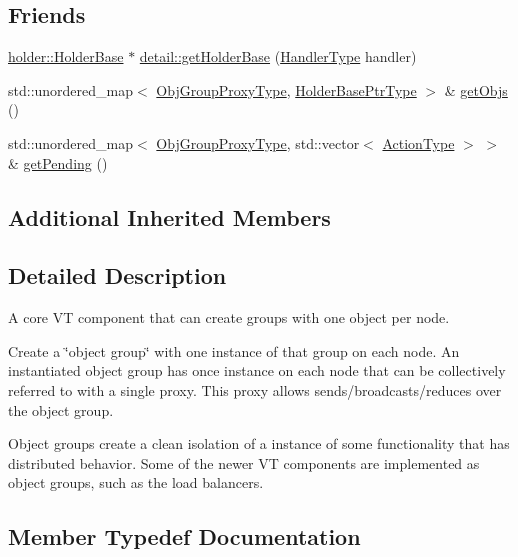 \subsection*{Friends}
\begin{DoxyCompactItemize}
\item 
\hyperlink{structvt_1_1objgroup_1_1holder_1_1_holder_base}{holder\+::\+Holder\+Base} $\ast$ \hyperlink{structvt_1_1objgroup_1_1_obj_group_manager_a82fbcce71412249dde967ed026e172fe}{detail\+::get\+Holder\+Base} (\hyperlink{namespacevt_af64846b57dfcaf104da3ef6967917573}{Handler\+Type} handler)
\item 
std\+::unordered\+\_\+map$<$ \hyperlink{namespacevt_ad7cae989df485fccca57f0792a880a8e}{Obj\+Group\+Proxy\+Type}, \hyperlink{structvt_1_1objgroup_1_1_obj_group_manager_ac1e9bb19d4a5923dd6d595bad28f04c9}{Holder\+Base\+Ptr\+Type} $>$ \& \hyperlink{structvt_1_1objgroup_1_1_obj_group_manager_a7ed69e806c1bc835de7080288a9803d9}{get\+Objs} ()
\item 
std\+::unordered\+\_\+map$<$ \hyperlink{namespacevt_ad7cae989df485fccca57f0792a880a8e}{Obj\+Group\+Proxy\+Type}, std\+::vector$<$ \hyperlink{namespacevt_ae0a5a7b18cc99d7b732cb4d44f46b0f3}{Action\+Type} $>$ $>$ \& \hyperlink{structvt_1_1objgroup_1_1_obj_group_manager_aff66fa57452fa48bed720f8a9aa99f94}{get\+Pending} ()
\end{DoxyCompactItemize}
\subsection*{Additional Inherited Members}


\subsection{Detailed Description}
A core VT component that can create groups with one object per node. 

Create a \char`\"{}object group\char`\"{} with one instance of that group on each node. An instantiated object group has once instance on each node that can be collectively referred to with a single proxy. This proxy allows sends/broadcasts/reduces over the object group.

Object groups create a clean isolation of a instance of some functionality that has distributed behavior. Some of the newer VT components are implemented as object groups, such as the load balancers. 

\subsection{Member Typedef Documentation}
\mbox{\label{structvt_1_1objgroup_1_1_obj_group_manager_ac1e9bb19d4a5923dd6d595bad28f04c9}} 
